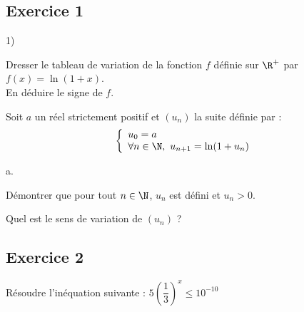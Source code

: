 \documentclass[11pt]{article}%
\begin{document}
\subsection*{Exercice 1}

  \begin{noliste}{1)}
  \item Dresser le tableau de variation de la fonction $f$ définie sur
    $\R^+$ par $f(x) = \ln (1+x)$.\\
    En déduire le signe de $f$.
  \item Soit $a$ un réel strictement positif et $(u_n)$ la suite
    définie par :
    \[
    \left\{
      \begin{array}{l}
        u_0 = a \\
        \forall n \in \N, \ u_{n+1} = \ln (1+u_n)
      \end{array}
    \right.
    \]
    \begin{noliste}{a.}
    \item Démontrer que pour tout $n \in \N$, $u_n$ est défini et $u_n 
> 
0$.
    \item Quel est le sens de variation de $(u_n)$ ?
    \end{noliste}
  \end{noliste}

\subsection*{Exercice 2}
\noindent
  Résoudre l'inéquation suivante : $5\left( \dfrac{1}{3}\right) ^{x}\leq 
10^{-10}$
\end{document}
